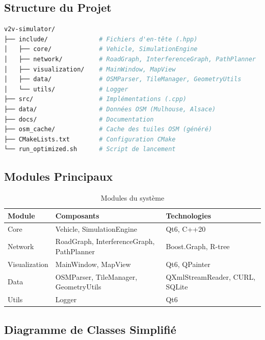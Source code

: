 \documentclass[12pt,a4paper]{article}
\begin{document}
\subsection{Structure du Projet}

\begin{lstlisting}[language=bash, caption={Arborescence du projet}]
v2v-simulator/
├── include/              # Fichiers d'en-tête (.hpp)
│   ├── core/             # Vehicle, SimulationEngine
│   ├── network/          # RoadGraph, InterferenceGraph, PathPlanner
│   ├── visualization/    # MainWindow, MapView
│   ├── data/             # OSMParser, TileManager, GeometryUtils
│   └── utils/            # Logger
├── src/                  # Implémentations (.cpp)
├── data/                 # Données OSM (Mulhouse, Alsace)
├── docs/                 # Documentation
├── osm_cache/            # Cache des tuiles OSM (généré)
├── CMakeLists.txt        # Configuration CMake
└── run_optimized.sh      # Script de lancement
\end{lstlisting}

\subsection{Modules Principaux}

\begin{table}[H]
\centering
\begin{tabular}{lll}
\toprule
\textbf{Module} & \textbf{Composants} & \textbf{Technologies} \\
\midrule
Core & Vehicle, SimulationEngine & Qt6, C++20 \\
Network & RoadGraph, InterferenceGraph, PathPlanner & Boost.Graph, R-tree \\
Visualization & MainWindow, MapView & Qt6, QPainter \\
Data & OSMParser, TileManager, GeometryUtils & QXmlStreamReader, CURL, SQLite \\
Utils & Logger & Qt6 \\
\bottomrule
\end{tabular}
\caption{Modules du système}
\end{table}

\subsection{Diagramme de Classes Simplifié}
\end{document}
